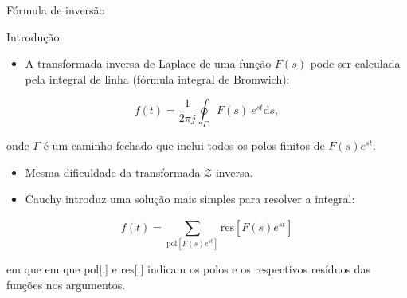 \begin{frame}{Fórmula de inversão}
\begin{block}{Introdução}
\begin{itemize}
	\item A transformada inversa de Laplace de uma função $F(s)$ pode ser calculada pela integral de linha (fórmula integral de Bromwich):
\end{itemize}

    \[ f(t)=\dfrac{1}{2\pi j}\oint_{\Gamma} F(s) \ e^{st} \text{d}s, \]

onde $\Gamma$ é um caminho fechado que inclui todos os polos finitos de $F(s)e^{st}$.

\begin{itemize}
	\item Mesma dificuldade da transformada $\mathcal{Z}$ inversa.
	\item Cauchy introduz uma solução mais simples para resolver a integral:
\end{itemize}
$$f(t) = \sum_{\text{pol}\left[F(s)e^{st}\right]}^{} \text{res}\left[F(s)e^{st}\right]$$

em que em que pol[.] e res[.] indicam os polos e os respectivos resíduos das funções nos argumentos.
\end{block}
\end{frame}




